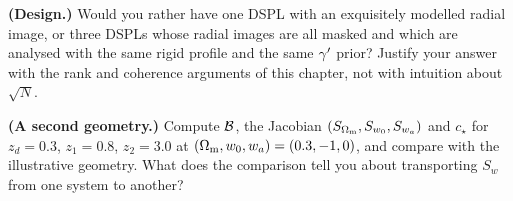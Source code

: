 \begin{exercise}
\label{ex:cs_design}
\textbf{(Design.)}
Would you rather have one DSPL with an exquisitely modelled radial
image, or three DSPLs whose radial images are all masked and which are
analysed with the same rigid profile and the same $\gamma'$ prior? Justify
your answer with the rank and coherence arguments of this chapter, not
with intuition about $\sqrt N$.
\end{exercise}

\begin{exercise}
\label{ex:cs_newgeom}
\textbf{(A second geometry.)}
Compute $\mathcal{B}$, the Jacobian $(S_{\Omega_{\mathrm{m}}},S_{w_0},S_{w_a})$ and
$c_\star$ for $z_d=0.3$, $z_1=0.8$, $z_2=3.0$ at
$(\Omega_{\mathrm{m}},w_0,w_a)=(0.3,-1,0)$, and compare with the illustrative
geometry. What does the comparison tell you about transporting $S_w$
from one system to another?
\end{exercise}

